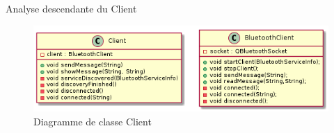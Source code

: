 Analyse descendante du Client
	\begin{figure}[H]
		\centering
		\includegraphics[scale=1]{./images/diagrammeClasseClient.png}
		\caption{Diagramme de classe Client}
	\end{figure}